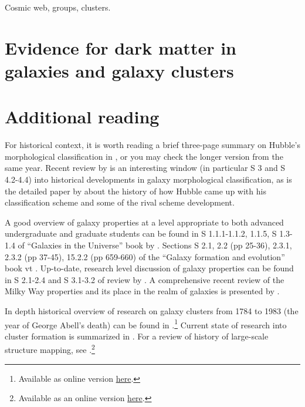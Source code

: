 Cosmic web, groups, clusters.

\section{Evidence for dark matter in galaxies and galaxy clusters}
\label{sec:dmevidence}


\section{Additional reading}

For historical context, it is worth reading a brief three-page summary on Hubble's morphological classification in \href{http://adsabs.harvard.edu/abs/1926PASP...38..258H}{\citet{hubble26a}}, or you may check  the longer version
\href{http://adsabs.harvard.edu/abs/1926ApJ....64..321H}{\citet{hubble26}} from the same year. Recent review by \href{http://adsabs.harvard.edu/abs/2005ARA%26A..43..581S}{\citet{sandage05}} is an interesting window (in particular S 3 and S 4.2-4.4) into historical developments in galaxy morphological classification, as is the detailed paper by \citet{hart_berendzen71} about the history of how Hubble came up with his classification scheme and some of the rival scheme development.  

A good overview of galaxy properties at a level appropriate to both advanced undergraduate and graduate students can be found in S 1.1.1-1.1.2, 1.1.5, S 1.3-1.4 of ``Galaxies in the Universe'' book by \citet[][hereafter GS]{sparke_gallagher07}. 
Sections S 2.1, 2.2 (pp 25-36), 2.3.1, 2.3.2 (pp 37-45), 15.2.2 (pp 659-660) of the ``Galaxy formation and evolution'' book vt \citet*[][hereafter MvdBW]{mo_etal10}.
Up-to-date, research level discussion of galaxy properties can be found in S 2.1-2.4 and S 3.1-3.2 of review by \citet{blanton_moustakas09}.  A comprehensive recent review of the Milky Way properties and its place in the realm of galaxies is presented by \href{http://adsabs.harvard.edu/abs/2016arXiv160207702B}{\citet{blandhawthorn_gerhard16}}.

In depth historical overview of research on galaxy clusters from 1784 to 1983 (the year of George Abell's death) can be found in \href{http://adsabs.harvard.edu/abs/2000cucg.confE...1B}{\citet{biviano00}}.\footnote{Available as online version \href{https://ned.ipac.caltech.edu/level5/Biviano2/frames.html}{here}.} Current state of research into cluster formation is summarized in \href{http://adsabs.harvard.edu/abs/2012ARA%26A..50..353K}{\citet{kravtsov_borgani12}}. For a review of history of large-scale structure mapping, see \href{http://adsabs.harvard.edu/abs/2011arXiv1109.1268T}{\citet{thompson_gregory11}}.\footnote{Available as an online version \href{http://www.lairdthompson.net/void.html}{here}.}


